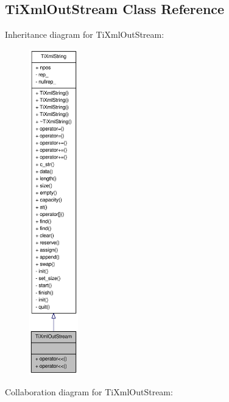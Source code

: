 \hypertarget{class_ti_xml_out_stream}{
\subsection{TiXmlOutStream Class Reference}
\label{class_ti_xml_out_stream}
}
Inheritance diagram for TiXmlOutStream:\nopagebreak
\begin{figure}[H]
\begin{center}
\leavevmode
\includegraphics[height=400pt]{class_ti_xml_out_stream__inherit__graph}
\end{center}
\end{figure}
Collaboration diagram for TiXmlOutStream:\nopagebreak

